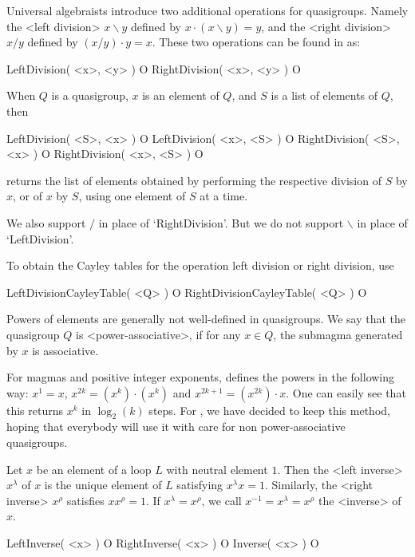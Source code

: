 Universal algebraists introduce two additional operations for quasigroups.
Namely the <left division> $x\backslash y$ defined by
$x\cdot(x\backslash y)=y$, and the <right division> $x/y$
defined by $(x/y)\cdot y=x$. These two operations can be found in {\LOOPS} as:

\>LeftDivision( <x>, <y> ) O
\>RightDivision( <x>, <y> ) O

When $Q$ is a quasigroup, $x$ is an element of $Q$, and $S$ is a list of
elements of $Q$, then

\>LeftDivision( <S>, <x> ) O
\>LeftDivision( <x>, <S> ) O
\>RightDivision( <S>, <x> ) O
\>RightDivision( <x>, <S> ) O

returns the list of elements obtained by performing the respective
division of $S$ by $x$, or of $x$ by $S$, using one element of $S$ at a time.

We also support $/$ in place of `RightDivision'. But we do not support
$\backslash$ in place of `LeftDivision'.

To obtain the Cayley tables for the operation left division or
right division, use

\>LeftDivisionCayleyTable( <Q> ) O
\>RightDivisionCayleyTable( <Q> ) O


Powers of elements are generally not well-defined in quasigroups. We say that
the quasigroup $Q$ is <power-associative>, if for
any $x\in Q$, the submagma generated by $x$ is associative.

For magmas and positive integer exponents, {\GAP} defines the powers in the
following way: $x^1=x$, $x^{2k}=(x^k)\cdot(x^k)$ and $x^{2k+1}=(x^{2k})\cdot
x$. One can easily see that this returns $x^k$ in $\log_2(k)$ steps. For
{\LOOPS}, we have decided to keep this method, hoping that everybody will use
it with care for non power-associative quasigroups.

Let $x$ be an element of a loop $L$ with neutral element $1$. Then the <left
inverse> $x^\lambda$ of $x$ is the unique element of $L$
satisfying $x^\lambda x=1$. Similarly, the <right inverse>
$x^\rho$ satisfies $xx^\rho=1$. If $x^\lambda=x^\rho$, we call
$x^{-1}=x^\lambda=x^\rho$ the <inverse> of $x$.

\>LeftInverse( <x> ) O
\>RightInverse( <x> ) O
\>Inverse( <x> ) O

